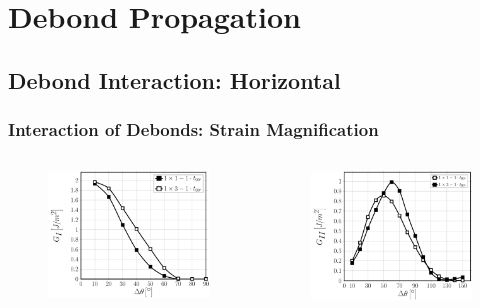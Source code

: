 \documentclass[first,firstsupp,lastsupp,last,hyperref,table]{ETHclass}
\begin{document}
\section{Debond Propagation}

\subsection{Debond Interaction: Horizontal}

\begin{frame}
\frametitle{\vspace{0.2cm}\small Interaction of Debonds: Strain Magnification}
\vspace{-.75cm}
\centering
\begin{columns}[c]
\centering
\begin{column}{0.5\textwidth}
\centering
\begin{figure}
\centering
\includegraphics[width=\columnwidth]{nxk-1-vf60-GI-strainmagni1.pdf}
\end{figure}
\end{column}
\begin{column}{0.5\textwidth}
\centering
\begin{figure}
\centering
\includegraphics[width=\columnwidth]{nxk-1-vf60-GII-strainmagni1.pdf}

\end{figure}
\end{column}
\end{columns}
\end{frame}
\end{document}
